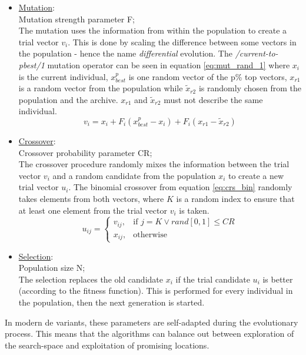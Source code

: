 \documentclass[./\jobname.tex]{subfiles}
\begin{document}
\begin{itemize}
	\item \underline{Mutation}: \\
		  Mutation strength parameter F;\\
		  The mutation uses the information from within the population to create a trial vector $v_i$. This is done by scaling the difference between some vectors in the population - hence the name \textit{differential} evolution. The \textit{/current-to-pbest/1} mutation operator can be seen in equation \eqref{eq:mut_rand_1} where $x_i$ is the current individual, $x_{best}^p$ is one random vector of the p\% top vectors, $x_{r1}$ is a random vector from the population while $\tilde{x}_{r2}$ is randomly chosen from the population and the archive. $x_{r1}$ and $\tilde{x}_{r2}$ must not describe the same individual.
		  \begin{equation}
		  \label{eq:mut_rand_1}
		  v_i = x_{i} + F_i(x_{best}^p - x_{i}) + F_i(x_{r1} - \tilde{x}_{r2})
		  \end{equation}
	\item \underline{Crossover}: \\
		  Crossover probability parameter CR;\\
		  The crossover procedure randomly mixes the information between the trial vector $v_i$ and a random candidate from the population $x_{i}$ to create a new trial vector $u_i$. The binomial crossover from equation \eqref{eq:crs_bin} randomly takes elements from both vectors, where $K$ is a random index to ensure that at least one element from the trial vector $v_i$ is taken.
		  \begin{equation}
		  \label{eq:crs_bin}
		  u_{ij}=\begin{cases}
		  v_{ij}, &\text{if $j = K \lor rand[0,1] \leq CR$}\\
		  x_{ij}, &\text{otherwise}
		  \end{cases}
		  \end{equation}
	\item \underline{Selection}: \\
		  Population size N;\\
		  The selection replaces the old candidate $x_i$ if the trial candidate $u_i$ is better (according to the fitness function). This is performed for every individual in the population, then the next generation is started.
\end{itemize}  

In modern \gls{de} variants, these parameters are self-adapted during the evolutionary process. This means that the algorithms can balance out between exploration of the search-space and exploitation of promising locations. 
\end{document}
